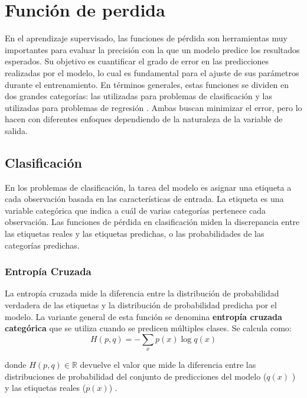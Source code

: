 \section{Función de perdida}

En el aprendizaje supervisado, las funciones de pérdida son herramientas muy importantes para evaluar la precisión con la que un modelo predice los resultados esperados. Su objetivo es cuantificar el grado de error en las predicciones realizadas por el modelo, lo cual es fundamental para el ajuste de sus parámetros durante el entrenamiento. En términos generales, estas funciones se dividen en dos grandes categorías: las utilizadas para problemas de clasificación y las utilizadas para problemas de regresión \citep{pajares2021aprendizaje}. Ambas buscan minimizar el error, pero lo hacen con diferentes enfoques dependiendo de la naturaleza de la variable de salida.

\subsection{Clasificación}

En los problemas de clasificación, la tarea del modelo es asignar una etiqueta a cada observación basada en las características de entrada. La etiqueta es una variable categórica que indica a cuál de varias categorías pertenece cada observación. Las funciones de pérdida en clasificación miden la discrepancia entre las etiquetas reales y las etiquetas predichas, o las probabilidades de las categorías predichas.

\subsubsection{Entropía Cruzada}

La entropía cruzada mide la diferencia entre la distribución de probabilidad verdadera de las etiquetas y la distribución de probabilidad predicha por el modelo. La variante general de esta función se denomina \textbf{entropía cruzada categórica} que se utiliza cuando se predicen múltiples clases. Se calcula como:
\begin{equation}
    H(p, q) = -\sum_{x} p(x) \log q(x) 
\end{equation}

donde $H(p,q) \in \mathbb{R}$ devuelve el valor que mide la diferencia entre las distribuciones de probabilidad del conjunto de predicciones del modelo  (\(q(x)\) ) y las etiquetas reales (\(p(x)\)) \citep{pajares2021aprendizaje}. 


